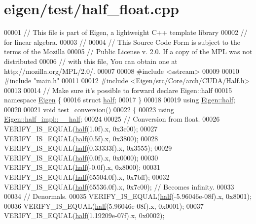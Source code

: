 \hypertarget{eigen_2test_2half__float_8cpp_source}{}\section{eigen/test/half\+\_\+float.cpp}
\label{eigen_2test_2half__float_8cpp_source}

\begin{DoxyCode}
00001 \textcolor{comment}{// This file is part of Eigen, a lightweight C++ template library}
00002 \textcolor{comment}{// for linear algebra.}
00003 \textcolor{comment}{//}
00004 \textcolor{comment}{// This Source Code Form is subject to the terms of the Mozilla}
00005 \textcolor{comment}{// Public License v. 2.0. If a copy of the MPL was not distributed}
00006 \textcolor{comment}{// with this file, You can obtain one at http://mozilla.org/MPL/2.0/.}
00007 
00008 \textcolor{preprocessor}{#include <sstream>}
00009 
00010 \textcolor{preprocessor}{#include "main.h"}
00011 
00012 \textcolor{preprocessor}{#include <Eigen/src/Core/arch/CUDA/Half.h>}
00013 
00014 \textcolor{comment}{// Make sure it's possible to forward declare Eigen::half}
00015 \textcolor{keyword}{namespace }\hyperlink{namespace_eigen}{Eigen} \{
00016 \textcolor{keyword}{struct }\hyperlink{struct_eigen_1_1half}{half};
00017 \}
00018 
00019 \textcolor{keyword}{using} \hyperlink{struct_eigen_1_1half}{Eigen::half};
00020 
00021 \textcolor{keywordtype}{void} test\_conversion()
00022 \{
00023   \textcolor{keyword}{using} \hyperlink{struct_eigen_1_1half__impl_1_1____half}{Eigen::half\_impl::\_\_half};
00024 
00025   \textcolor{comment}{// Conversion from float.}
00026   VERIFY\_IS\_EQUAL(\hyperlink{struct_eigen_1_1half}{half}(1.0f).x, 0x3c00);
00027   VERIFY\_IS\_EQUAL(\hyperlink{struct_eigen_1_1half}{half}(0.5f).x, 0x3800);
00028   VERIFY\_IS\_EQUAL(\hyperlink{struct_eigen_1_1half}{half}(0.33333f).x, 0x3555);
00029   VERIFY\_IS\_EQUAL(\hyperlink{struct_eigen_1_1half}{half}(0.0f).x, 0x0000);
00030   VERIFY\_IS\_EQUAL(\hyperlink{struct_eigen_1_1half}{half}(-0.0f).x, 0x8000);
00031   VERIFY\_IS\_EQUAL(\hyperlink{struct_eigen_1_1half}{half}(65504.0f).x, 0x7bff);
00032   VERIFY\_IS\_EQUAL(\hyperlink{struct_eigen_1_1half}{half}(65536.0f).x, 0x7c00);  \textcolor{comment}{// Becomes infinity.}
00033 
00034   \textcolor{comment}{// Denormals.}
00035   VERIFY\_IS\_EQUAL(\hyperlink{struct_eigen_1_1half}{half}(-5.96046e-08f).x, 0x8001);
00036   VERIFY\_IS\_EQUAL(\hyperlink{struct_eigen_1_1half}{half}(5.96046e-08f).x, 0x0001);
00037   VERIFY\_IS\_EQUAL(\hyperlink{struct_eigen_1_1half}{half}(1.19209e-07f).x, 0x0002);

\end{DoxyCode}

